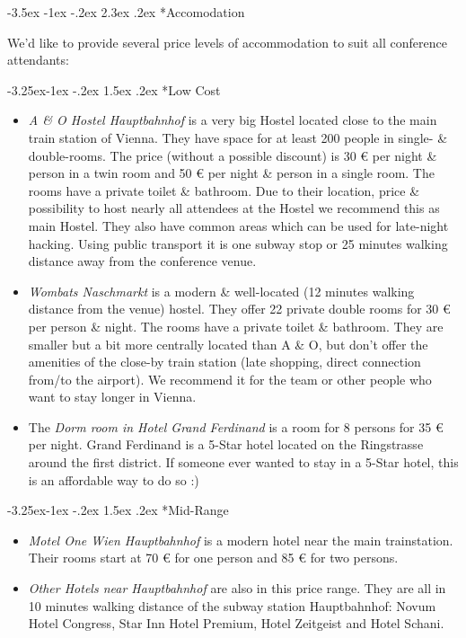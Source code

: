 \documentclass[10pt,a4paper]{article}
\makeatletter
\renewcommand\section{%
\@startsection{section}{1}{\z@}%
              {-3.5ex \@plus -1ex \@minus -.2ex}%
              {2.3ex \@plus.2ex}%
              {\color{kdelight}\sffamily\LARGE\bfseries}}
\renewcommand\subsection{%
\@startsection{subsection}{2}{\z@}%
              {-3.25ex\@plus -1ex \@minus -.2ex}%
              {1.5ex \@plus .2ex}%
              {\color{kdelight}\sffamily\Large\bfseries}}
\makeatother
\begin{document}
\cleardoublepage

\section*{Accomodation}
We'd like to provide several price levels of accommodation to suit all conference attendants:

\subsection*{Low Cost}
\begin{itemize}
\item \emph{A \& O Hostel Hauptbahnhof} is a very big Hostel located close to the main train station of Vienna. They have space for at least 200 people in single- \& double-rooms. The price (without a possible discount) is 30 \euro{} per night \& person in a twin room and 50 \euro{} per night \& person in a single room. The rooms have a private toilet \& bathroom. Due to their location, price \& possibility to host nearly all attendees at the Hostel we recommend this as main Hostel. They also have common areas which can be used for late-night hacking. Using public transport it is one subway stop or 25 minutes walking distance away from the conference venue.
\item \emph{Wombats Naschmarkt} is a modern \& well-located (12 minutes walking distance from the venue) hostel. They offer 22 private double rooms for 30 \euro{} per person \& night. The rooms have a private toilet \& bathroom. They are smaller but a bit more centrally located than A \& O, but don't offer the amenities of the close-by train station (late shopping, direct connection from/to the airport). We recommend it for the team or other people who want to stay longer in Vienna.
\item The \emph{Dorm room in Hotel Grand Ferdinand}  is a room for 8 persons for 35 \euro{} per night. Grand Ferdinand is a 5-Star hotel located on the Ringstrasse around the first district. If someone ever wanted to stay in a 5-Star hotel, this is an affordable way to do so :)
\end{itemize}

\subsection*{Mid-Range}
\begin{itemize}
\item \emph{Motel One Wien Hauptbahnhof} is a modern hotel near the main trainstation. Their rooms start at 70 \euro{} for one person and 85 \euro{} for two persons.
\item \emph{Other Hotels near Hauptbahnhof} are also in this price range. They are all in 10 minutes walking distance of the subway station Hauptbahnhof: Novum Hotel Congress, Star Inn Hotel Premium, Hotel Zeitgeist and Hotel Schani.
\end{itemize}
\end{document}
